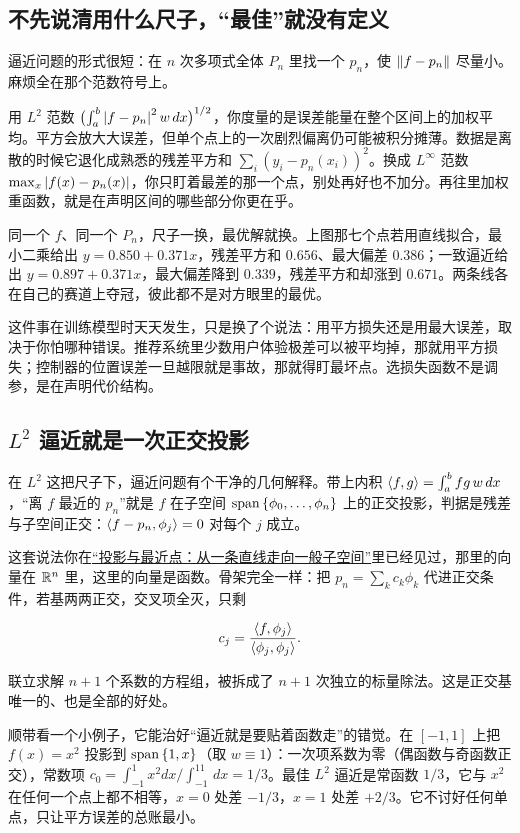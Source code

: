 \subsection{不先说清用什么尺子，``最佳''就没有定义}

逼近问题的形式很短：在 \(n\) 次多项式全体 \(P_n\) 里找一个 \(p_n\)，使 \(\left\lVert f-p_n\right\rVert\) 尽量小。麻烦全在那个范数符号上。

用 \(L^2\) 范数 \(\bigl(\int_a^b\left|f-p_n\right|^2w\,dx\bigr)^{1/2}\)，你度量的是误差能量在整个区间上的加权平均。平方会放大大误差，但单个点上的一次剧烈偏离仍可能被积分摊薄。数据是离散的时候它退化成熟悉的残差平方和 \(\sum_i(y_i-p_n(x_i))^2\)。换成 \(L^\infty\) 范数 \(\max_{x}\left|f(x)-p_n(x)\right|\)，你只盯着最差的那一个点，别处再好也不加分。再往里加权重函数，就是在声明区间的哪些部分你更在乎。

同一个 \(f\)、同一个 \(P_n\)，尺子一换，最优解就换。上图那七个点若用直线拟合，最小二乘给出 \(y=0.850+0.371x\)，残差平方和 \(0.656\)、最大偏差 \(0.386\)；一致逼近给出 \(y=0.897+0.371x\)，最大偏差降到 \(0.339\)，残差平方和却涨到 \(0.671\)。两条线各在自己的赛道上夺冠，彼此都不是对方眼里的最优。

这件事在训练模型时天天发生，只是换了个说法：用平方损失还是用最大误差，取决于你怕哪种错误。推荐系统里少数用户体验极差可以被平均掉，那就用平方损失；控制器的位置误差一旦越限就是事故，那就得盯最坏点。选损失函数不是调参，是在声明代价结构。

\subsection{\texorpdfstring{\(L^2\) 逼近就是一次正交投影}{L2 逼近就是一次正交投影}}

在 \(L^2\) 这把尺子下，逼近问题有个干净的几何解释。带上内积 \(\left\langle f,g\right\rangle=\int_a^b f g\,w\,dx\)，``离 \(f\) 最近的 \(p_n\)''就是 \(f\) 在子空间 \(\operatorname{span}\left\{\phi_0,\dots,\phi_n\right\}\) 上的正交投影，判据是残差与子空间正交：\(\left\langle f-p_n,\phi_j\right\rangle=0\) 对每个 \(j\) 成立。

这套说法你在\hyperref[sec:03-Linear-Algebra/03-Orthogonality/02]{``投影与最近点：从一条直线走向一般子空间''}里已经见过，那里的向量在 \(\mathbb{R}^n\) 里，这里的向量是函数。骨架完全一样：把 \(p_n=\sum_k c_k\phi_k\) 代进正交条件，若基两两正交，交叉项全灭，只剩

\[
c_j=\frac{\left\langle f,\phi_j\right\rangle}{\left\langle\phi_j,\phi_j\right\rangle}.
\]

联立求解 \(n+1\) 个系数的方程组，被拆成了 \(n+1\) 次独立的标量除法。这是正交基唯一的、也是全部的好处。

顺带看一个小例子，它能治好``逼近就是要贴着函数走''的错觉。在 \([-1,1]\) 上把 \(f(x)=x^2\) 投影到 \(\operatorname{span}\left\{1,x\right\}\)（取 \(w\equiv1\)）：一次项系数为零（偶函数与奇函数正交），常数项 \(c_0=\int_{-1}^1x^2dx\big/\int_{-1}^11\,dx=1/3\)。最佳 \(L^2\) 逼近是常函数 \(1/3\)，它与 \(x^2\) 在任何一个点上都不相等，\(x=0\) 处差 \(-1/3\)，\(x=1\) 处差 \(+2/3\)。它不讨好任何单点，只让平方误差的总账最小。

